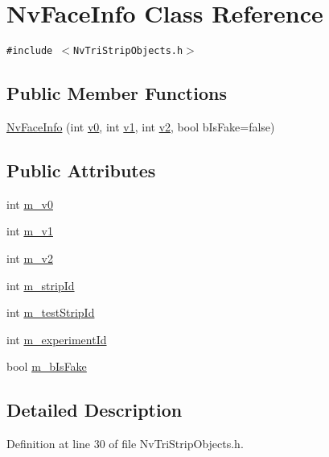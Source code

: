 \hypertarget{class_nv_face_info}{
\section{NvFaceInfo Class Reference}
\label{class_nv_face_info}
}
{\tt \#include $<$NvTriStripObjects.h$>$}

\subsection*{Public Member Functions}
\begin{CompactItemize}
\item 
\hyperlink{class_nv_face_info_70f29df90b39a59cc72a78ac17d1534d}{NvFaceInfo} (int \hyperlink{glext__bak_8h_8f5597b6002609ead33af221dcf29790}{v0}, int \hyperlink{glext__bak_8h_435c176a02c061b43e19bdf7c86cceae}{v1}, int \hyperlink{glext__bak_8h_0928f6d0f0f794ba000a21dfae422136}{v2}, bool bIsFake=false)
\end{CompactItemize}
\subsection*{Public Attributes}
\begin{CompactItemize}
\item 
int \hyperlink{class_nv_face_info_699f61c4fd052ec4e4f360792ecd251e}{m\_\-v0}
\item 
int \hyperlink{class_nv_face_info_95048ca744a289e9842f241dc3dbddd8}{m\_\-v1}
\item 
int \hyperlink{class_nv_face_info_39397db282d929de5aa951bb9a453167}{m\_\-v2}
\item 
int \hyperlink{class_nv_face_info_d0229ac7acde8d0048910429ed8d0887}{m\_\-stripId}
\item 
int \hyperlink{class_nv_face_info_40771ba143905835be0db404c7a8d92c}{m\_\-testStripId}
\item 
int \hyperlink{class_nv_face_info_b2cd22f81463cd7fb8b43a4a14040317}{m\_\-experimentId}
\item 
bool \hyperlink{class_nv_face_info_3eb9c236439d47f135f94e445e5d4a6c}{m\_\-bIsFake}
\end{CompactItemize}


\subsection{Detailed Description}


Definition at line 30 of file NvTriStripObjects.h.

